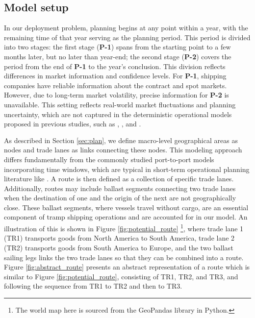 \documentclass[11pt,english]{article}
\begin{document}
\subsection{Model setup}

In our deployment problem, planning begins at any point within a year, with the remaining time of that year serving as the planning period. This period is divided into two stages: the first stage (\textbf{P-1}) spans from the starting point to a few months later, but no later than year-end; the second stage (\textbf{P-2}) covers the period from the end of \textbf{P-1} to the year's conclusion. This division reflects differences in market information and confidence levels. For \textbf{P-1}, shipping companies have reliable information about the contract and spot markets. However, due to long-term market volatility, precise information for \textbf{P-2} is unavailable. This setting reflects real-world market fluctuations and planning uncertainty, which are not captured in the deterministic operational models proposed in previous studies, such as \cite{meng2015tailored}, \cite{korsvik2011large}, and \cite{cheng2025cargo}.

As described in Section \ref{sec:plan}, we define macro-level geographical areas as nodes and trade lanes as links connecting these nodes. This modeling approach differs fundamentally from the commonly studied port-to-port models incorporating time windows, which are typical in short-term operational planning literature like \cite{cheng2025cargo}. A route is then defined as a collection of specific trade lanes. Additionally, routes may include ballast segments connecting two trade lanes when the destination of one and the origin of the next are not geographically close. These ballast segments, where vessels travel without cargo, are an essential component of tramp shipping operations and are accounted for in our model. An illustration of this is shown in Figure \ref{fig:potential_route} \footnote{The world map here is sourced from the GeoPandas library in Python.}, where trade lane 1 (TR1) transports goods from North America to South America, trade lane 2 (TR2) transports goods from South America to Europe, and the two ballast sailing legs links the two trade lanes so that they can be combined into a route. Figure \ref{fig:abstract_route} presents an abstract representation of a route which is similar to Figure \ref{fig:potential_route}, consisting of TR1, TR2, and TR3, and following the sequence from TR1 to TR2 and then to TR3.
\end{document}
